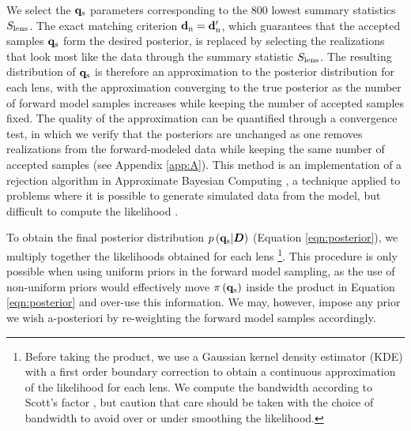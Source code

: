 We select the ${\bf{q}_{\rm{s}}}$ parameters corresponding to the $800$ lowest summary statistics $S_{\rm{lens}}$. The exact matching criterion ${\bf{d}_{\rm{n}}} = {\bf{d}_{\rm{n}}^{\prime}}$, which guarantees that the accepted samples ${\bf{q}_{\rm{s}}}$ form the desired posterior, is replaced by selecting the realizations that look most like the data through the summary statistic $S_{\rm{lens}}$. The resulting distribution of ${\bf{q}_{\rm{s}}}$ is therefore an approximation to the posterior distribution for each lens, with the approximation converging to the true posterior as the number of forward model samples increases while keeping the number of accepted samples fixed. The quality of the approximation can be quantified through a convergence test, in which we verify that the posteriors are unchanged as one removes realizations from the forward-modeled data while keeping the same number of accepted samples (see Appendix \ref{app:A}). This method is an implementation of a rejection algorithm in Approximate Bayesian Computing \cite{Rubin1984,Marin++11,Lintusaari++17}, a technique applied to problems where it is possible to generate simulated data from the model, but difficult to compute the likelihood \cite[see also][]{Beaumont++02,Akeret++15,Birrer++17a,Hahn++17}.

To obtain the final posterior distribution $p \left({\bf{q}_{\rm{s}}} | \boldsymbol{D}\right)$ (Equation \ref{eqn:posterior}), we multiply together the likelihoods obtained for each lens \footnote{Before taking the product, we use a Gaussian kernel density estimator (KDE) with a first order boundary correction \cite[e.g.][]{Lewis15} to obtain a continuous approximation of the likelihood for each lens. We compute the bandwidth according to Scott's factor \cite{Scott92}, but caution that care should be taken with the choice of bandwidth to avoid over or under smoothing the likelihood.}. This procedure is only possible when using uniform priors in the forward model sampling, as the use of non-uniform priors would effectively move $\pi \left({\bf{q}_{\rm{s}}}\right)$ inside the product in Equation \ref{eqn:posterior} and over-use this information. We may, however, impose any prior we wish a-posteriori by re-weighting the forward model samples accordingly. 

